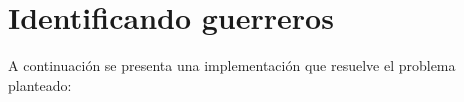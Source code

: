 \section{Identificando guerreros}

A continuación se presenta una implementación que resuelve el problema planteado:


